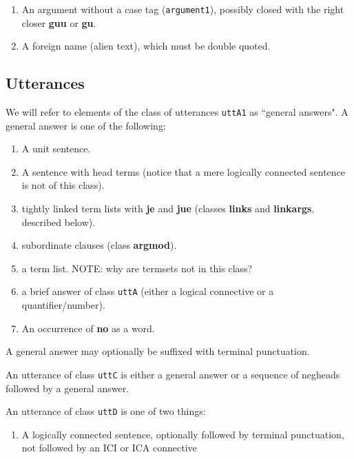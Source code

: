 \documentclass[12pt]{book}
\begin{document}
{\begin{enumerate}
\item An argument without a case tag ({\tt argument1}), possibly closed with the right closer {\bf guu} or {\bf gu}.

\item  A foreign name (alien text), which must be double quoted.

\end{enumerate}

\subsection{Utterances}

We will refer to elements of the class of utterances {\tt uttA1} as ``general answers".   A general answer is one of the following:

\begin{enumerate}

\item A unit sentence.

\item  A sentence with head terms (notice that a mere logically connected sentence is not of this class).

\item  tightly linked term lists with {\bf je} and {\bf jue} (classes {\bf links} and {\bf linkargs}, described below).

\item  subordinate clauses (class {\bf argmod}).

\item a term list.  NOTE:  why are termsets not in this class?

\item a brief answer of class {\tt uttA} (either a logical connective or a quantifier/number).

\item An occurrence of {\bf no} as a word.

\end{enumerate}

A general answer may optionally be suffixed with terminal punctuation.

An utterance of class {\tt uttC} is either a general answer or a sequence of negheads followed by a general answer.

An utterance of class {\tt uttD} is one of two things:

\begin{enumerate}

\item  A logically connected sentence, optionally followed by terminal punctuation, not followed by an ICI or ICA connective


\end{enumerate}}
\end{document}
